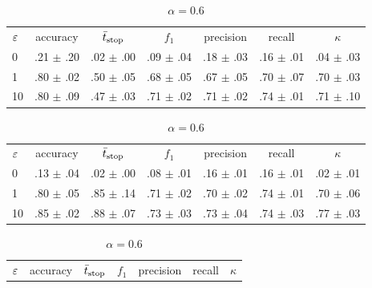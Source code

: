 \documentclass[%
  aspectratio=169,
  9pt,
  USenglish,
  titlegraphic, %
  progressbar,
]{beamer}
\begin{document}
\begin{frame}
\begin{table}
		\begin{subtable}{.5\textwidth}
			\scriptsize
			\hspace{-1em}\begin{tabular}{lcccccc}
				\toprule
				\textbf{$\varepsilon$} & accuracy & $\bar{t}_\text{stop}$  & $f_1$ & precision & recall & $\kappa$ \\
				\cmidrule(lr){0-0}\cmidrule(lr){1-1}\cmidrule(lr){2-2}\cmidrule(lr){3-3}\cmidrule(lr){4-4}\cmidrule(lr){5-5}\cmidrule(lr){6-6}\cmidrule(lr){7-7}
				0 & .21 $\pm$ .20 & .02 $\pm$ .00 & .09 $\pm$ .04 & .18 $\pm$ .03 & .16 $\pm$ .01 & .04 $\pm$ .03 \\
				1 & .80 $\pm$ .02 & .50 $\pm$ .05 & .68 $\pm$ .05 & .67 $\pm$ .05 & .70 $\pm$ .07 & .70 $\pm$ .03 \\
				10 & .80 $\pm$ .09 & .47 $\pm$ .03 & .71 $\pm$ .02 & .71 $\pm$ .02 & .74 $\pm$ .01 & .71 $\pm$ .10 \\
				\bottomrule
			\end{tabular}
			\caption{\emph{$\alpha=0.4$}}
			\label{tab:epsilon:a04}
		\end{subtable}
		\begin{subtable}{.5\textwidth}
			\scriptsize
			\hspace{-1em}\begin{tabular}{lcccccc}
				\toprule
				\textbf{$\varepsilon$} & accuracy & $\bar{t}_\text{stop}$  & $f_1$ & precision & recall & $\kappa$ \\
				\cmidrule(lr){0-0}\cmidrule(lr){1-1}\cmidrule(lr){2-2}\cmidrule(lr){3-3}\cmidrule(lr){4-4}\cmidrule(lr){5-5}\cmidrule(lr){6-6}\cmidrule(lr){7-7}
				0 & .13 $\pm$ .04 & .02 $\pm$ .00 & .08 $\pm$ .01 & .16 $\pm$ .01 & .16 $\pm$ .01 & .02 $\pm$ .01 \\
				1 & .80 $\pm$ .05 & .85 $\pm$ .14 & .71 $\pm$ .02 & .70 $\pm$ .02 & .74 $\pm$ .01 & .70 $\pm$ .06 \\
				10 & .85 $\pm$ .02 & .88 $\pm$ .07 & .73 $\pm$ .03 & .73 $\pm$ .04 & .74 $\pm$ .03 & .77 $\pm$ .03 \\
				\bottomrule
			\end{tabular}
			\caption{\emph{$\alpha=0.6$}}
			\label{tab:epsilon:a06}
		\end{subtable}
		\begin{subtable}{.5\textwidth}
			\scriptsize
			\hspace{-1em}\begin{tabular}{lcccccc}
				\toprule
				\textbf{$\varepsilon$} & accuracy & $\bar{t}_\text{stop}$  & $f_1$ & precision & recall & $\kappa$ \\

\end{tabular}
\end{subtable}
\end{table}
\end{frame}
\end{document}
